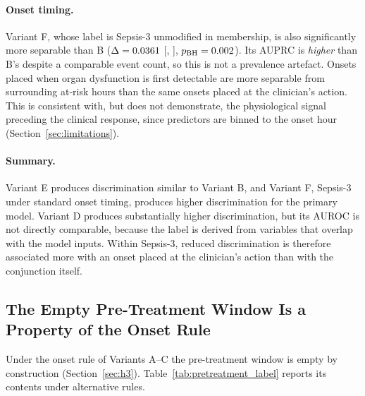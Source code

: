 \paragraph{Onset timing.}
Variant F, whose label is Sepsis-3 unmodified in membership, is also
significantly more separable than B ($\Delta = 0.0361$
[\pcAltDeltaCiLoPrimaryF, \pcAltDeltaCiHiPrimaryF],
$p_{\text{BH}} = 0.002$). Its AUPRC is \emph{higher} than B's
despite a comparable event count, so this is not a prevalence artefact. Onsets
placed when organ dysfunction is first detectable are more separable from
surrounding at-risk hours than the same onsets placed at the clinician's
action. This is consistent with, but does not demonstrate, the physiological
signal preceding the clinical response, since predictors are binned to the
onset hour (Section~\ref{sec:limitations}).

\paragraph{Summary.}
Variant E produces discrimination similar to Variant B, and Variant F,
Sepsis-3 under standard onset timing, produces higher discrimination for the
primary model. Variant D produces substantially higher discrimination, but its
AUROC is not directly comparable, because the label is derived from variables
that overlap with the model inputs. Within Sepsis-3, reduced discrimination is
therefore associated more with an onset placed at the clinician's action than
with the conjunction itself.

\subsection{The Empty Pre-Treatment Window Is a Property of the Onset Rule}
\label{sec:pretreatment_label}

Under the onset rule of Variants A--C the pre-treatment window is empty by
construction (Section~\ref{sec:h3}). Table~\ref{tab:pretreatment_label}
reports its contents under alternative rules.


